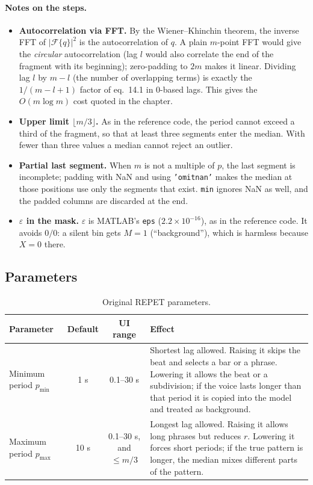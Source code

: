 \documentclass[11pt,a4paper]{article}
\newcommand{\code}[1]{\texttt{#1}}
\begin{document}
\paragraph{Notes on the steps.}
\begin{itemize}
  \item \textbf{Autocorrelation via FFT.} By the Wiener--Khinchin theorem,
        the inverse FFT of $|\mathcal F\{q\}|^2$ is the autocorrelation of $q$.
        A plain $m$-point FFT would give the \emph{circular} autocorrelation
        (lag $l$ would also correlate the end of the fragment with its
        beginning); zero-padding to $2m$ makes it linear. Dividing lag $l$
        by $m-l$ (the number of overlapping terms) is exactly the
        $1/(m-l+1)$ factor of eq.~14.1 in 0-based lags. This gives the
        $O(m\log m)$ cost quoted in the chapter.
  \item \textbf{Upper limit $\lfloor m/3\rfloor$.} As in the reference
        code, the period cannot exceed a third of the fragment, so that at
        least three segments enter the median. With fewer than three
        values a median cannot reject an outlier.
  \item \textbf{Partial last segment.} When $m$ is not a multiple of $p$,
        the last segment is incomplete; padding with NaN and using
        \code{'omitnan'} makes the median at those positions use only the
        segments that exist. \code{min} ignores NaN as well, and the padded
        columns are discarded at the end.
  \item \textbf{$\varepsilon$ in the mask.} $\varepsilon$ is MATLAB's
        \code{eps} ($2.2\times10^{-16}$), as in the reference code. It
        avoids $0/0$: a silent bin gets $M=1$ (``background''), which is
        harmless because $X=0$ there.
\end{itemize}

\subsection{Parameters}
\begin{table}[htbp]
\centering
\caption{Original REPET parameters.}
\label{tab:repet}
\begin{tabularx}{\linewidth}{@{}p{2.6cm}ccL@{}}
\toprule
Parameter & Default & UI range & Effect \\
\midrule
Minimum period $p_{\min}$ & 1 s & 0.1--30 s & Shortest lag allowed. Raising it skips the beat and selects a bar or a phrase. Lowering it allows the beat or a subdivision; if the voice lasts longer than that period it is copied into the model and treated as background. \\
Maximum period $p_{\max}$ & 10 s & 0.1--30 s, and $\le m/3$ & Longest lag allowed. Raising it allows long phrases but reduces $r$. Lowering it forces short periods; if the true pattern is longer, the median mixes different parts of the pattern. \\
\bottomrule
\end{tabularx}
\end{table}
\end{document}
